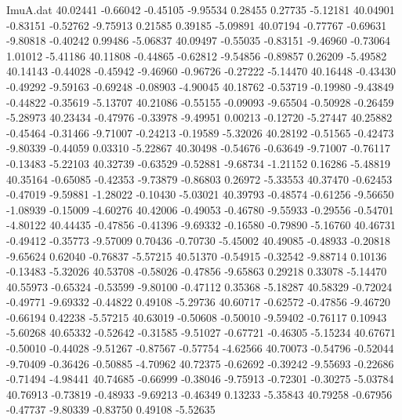 \begin{filecontents}{ImuA.dat}
  40.02441   -0.66042   -0.45105   -9.95534    0.28455    0.27735   -5.12181
  40.04901   -0.83151   -0.52762   -9.75913    0.21585    0.39185   -5.09891
  40.07194   -0.77767   -0.69631   -9.80818   -0.40242    0.99486   -5.06837
  40.09497   -0.55035   -0.83151   -9.46960   -0.73064    1.01012   -5.41186
  40.11808   -0.44865   -0.62812   -9.54856   -0.89857    0.26209   -5.49582
  40.14143   -0.44028   -0.45942   -9.46960   -0.96726   -0.27222   -5.14470
  40.16448   -0.43430   -0.49292   -9.59163   -0.69248   -0.08903   -4.90045
  40.18762   -0.53719   -0.19980   -9.43849   -0.44822   -0.35619   -5.13707
  40.21086   -0.55155   -0.09093   -9.65504   -0.50928   -0.26459   -5.28973
  40.23434   -0.47976   -0.33978   -9.49951    0.00213   -0.12720   -5.27447
  40.25882   -0.45464   -0.31466   -9.71007   -0.24213   -0.19589   -5.32026
  40.28192   -0.51565   -0.42473   -9.80339   -0.44059    0.03310   -5.22867
  40.30498   -0.54676   -0.63649   -9.71007   -0.76117   -0.13483   -5.22103
  40.32739   -0.63529   -0.52881   -9.68734   -1.21152    0.16286   -5.48819
  40.35164   -0.65085   -0.42353   -9.73879   -0.86803    0.26972   -5.33553
  40.37470   -0.62453   -0.47019   -9.59881   -1.28022   -0.10430   -5.03021
  40.39793   -0.48574   -0.61256   -9.56650   -1.08939   -0.15009   -4.60276
  40.42006   -0.49053   -0.46780   -9.55933   -0.29556   -0.54701   -4.80122
  40.44435   -0.47856   -0.41396   -9.69332   -0.16580   -0.79890   -5.16760
  40.46731   -0.49412   -0.35773   -9.57009    0.70436   -0.70730   -5.45002
  40.49085   -0.48933   -0.20818   -9.65624    0.62040   -0.76837   -5.57215
  40.51370   -0.54915   -0.32542   -9.88714    0.10136   -0.13483   -5.32026
  40.53708   -0.58026   -0.47856   -9.65863    0.29218    0.33078   -5.14470
  40.55973   -0.65324   -0.53599   -9.80100   -0.47112    0.35368   -5.18287
  40.58329   -0.72024   -0.49771   -9.69332   -0.44822    0.49108   -5.29736
  40.60717   -0.62572   -0.47856   -9.46720   -0.66194    0.42238   -5.57215
  40.63019   -0.50608   -0.50010   -9.59402   -0.76117    0.10943   -5.60268
  40.65332   -0.52642   -0.31585   -9.51027   -0.67721   -0.46305   -5.15234
  40.67671   -0.50010   -0.44028   -9.51267   -0.87567   -0.57754   -4.62566
  40.70073   -0.54796   -0.52044   -9.70409   -0.36426   -0.50885   -4.70962
  40.72375   -0.62692   -0.39242   -9.55693   -0.22686   -0.71494   -4.98441
  40.74685   -0.66999   -0.38046   -9.75913   -0.72301   -0.30275   -5.03784
  40.76913   -0.73819   -0.48933   -9.69213   -0.46349    0.13233   -5.35843
  40.79258   -0.67956   -0.47737   -9.80339   -0.83750    0.49108   -5.52635

\end{filecontents}
